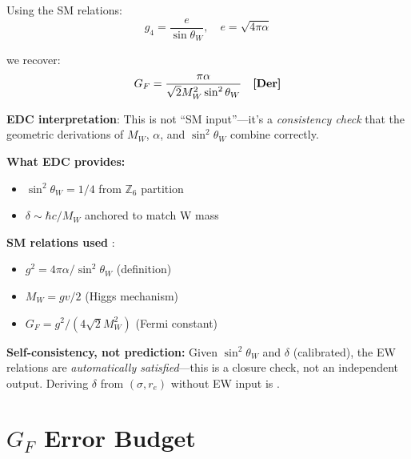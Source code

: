 Using the SM relations:
\begin{equation}
g_4 = \frac{e}{\sin\theta_W}, \quad e = \sqrt{4\pi\alpha}
\end{equation}

we recover:
\begin{equation}
G_F = \frac{\pi\alpha}{\sqrt{2}M_W^2\sin^2\theta_W} \quad \textbf{[Der]}
\end{equation}

\textbf{EDC interpretation}: This is not ``SM input''---it's a
\textit{consistency check} that the geometric derivations of
$M_W$, $\alpha$, and $\sin^2\theta_W$ combine correctly.

\begin{tcolorbox}[colback=yellow!5, colframe=yellow!50!black,
  title=\textbf{Dictionary: Electroweak Closure}]
\tagDc{}

\textbf{What EDC provides:}
\begin{itemize}[nosep]
\item $\sin^2\theta_W = 1/4$ from $\mathbb{Z}_6$ partition \tagDerSym{}
\item $\delta \sim \hbar c / M_W$ anchored to match W mass \tagCal{}
\end{itemize}

\textbf{SM relations used} \tagBL{}:
\begin{itemize}[nosep]
\item $g^2 = 4\pi\alpha/\sin^2\theta_W$ (definition)
\item $M_W = gv/2$ (Higgs mechanism)
\item $G_F = g^2/(4\sqrt{2}M_W^2)$ (Fermi constant)
\end{itemize}

\textbf{Self-consistency, not prediction:}
Given $\sin^2\theta_W$ and $\delta$ (calibrated), the EW relations are
\textit{automatically satisfied}---this is a closure check, not an independent output.
Deriving $\delta$ from $(\sigma, r_e)$ without EW input is .
\end{tcolorbox}

\section{$G_F$ Error Budget}
\label{sec:gf_error_budget}


